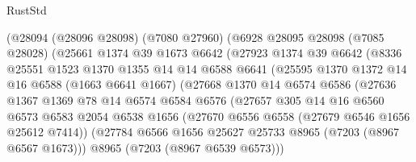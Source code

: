 \begin{lexlean}{RustStd}
\begin{coremodule}
                    (@28094
                      (@28096 @28098)
                      (@7080 @27960)
                      (@6928
                        @28095
                        @28098
                        (@7085 @28028)
                        (@25661
                          @1374
                          @39
                          @1673
                          @6642
                          (@27923
                            @1374
                            @39
                            @6642
                            (@8336
                              @25551
                              @1523
                              @1370
                              @1355
                              @14
                              @14
                              @6588
                              @6641
                              (@25595
                                @1370
                                @1372
                                @14
                                @16
                                @6588
                                (@1663 @6641 @1667)
                                (@27668
                                  @1370
                                  @14
                                  @6574
                                  @6586
                                  (@27636
                                    @1367
                                    @1369
                                    @78
                                    @14
                                    @6574
                                    @6584
                                    @6576
                                    (@27657
                                      @305
                                      @14
                                      @16
                                      @6560
                                      @6573
                                      @6583
                                      @2054
                                      @6538
                                      @1656
                                      (@27670 @6556 @6558 (@27679 @6546 @1656 @25612 @7414))
                                      (@27784
                                        @6566
                                        @1656
                                        @25627
                                        @25733
                                        @8965
                                        (@7203 (@8967 @6567 @1673)))
                                      @8965
                                      (@7203 (@8967 @6539 @6573)))

\end{coremodule}
\end{lexlean}
